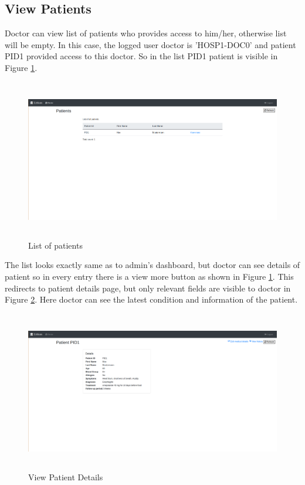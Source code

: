 \subsection{View Patients}
Doctor can view list of patients who provides access to him/her, otherwise list will be empty. In this case, the logged user doctor is 'HOSP1-DOC0' and patient PID1 provided access to this doctor. So in the list PID1 patient is visible in Figure \ref{fig:chapter04:doctor3}.

\begin{figure}[htbp]
 \centering
 \includegraphics[width=1.1\textwidth, height=7cm]{gfx/figures/doctor3.png}
 \caption{List of patients}
 \label{fig:chapter04:doctor3}
\end{figure}

The list looks exactly same as to admin's dashboard, but doctor can see details of patient so in every entry there is a view more button as shown in Figure \ref{fig:chapter04:doctor3}. This redirects to patient details page, but only relevant fields are visible to doctor in Figure \ref{fig:chapter04:doctor4}. Here doctor can see the latest condition and information of the patient.

\begin{figure}[htbp]
 \centering
 \includegraphics[width=1.1\textwidth, height=7cm]{gfx/figures/doctor4.png}
 \caption{View Patient Details}
 \label{fig:chapter04:doctor4}
\end{figure}


